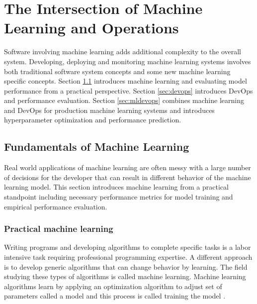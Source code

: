 \chapter{The Intersection of Machine Learning and Operations}
\label{chap:mloper}

Software involving machine learning adds additional complexity to the overall system. Developing, deploying and monitoring machine learning systems involves both traditional software system concepts and some new machine learning specific concepts. Section \ref{sec:ml} introduces machine learning and evaluating model performance from a practical perspective. Section \ref{sec:devops} introduces DevOps and performance evaluation. Section \ref{sec:mldevops} combines machine learning and DevOps for production machine learning systems and introduces hyperparameter optimization and performance prediction.

\section{Fundamentals of Machine Learning}
\label{sec:ml}
Real world applications of machine learning are often messy with a large number of decisions for the developer that can result in different behavior of the machine learning model. This section introduces machine learning from a practical standpoint including necessary performance metrics for model training and empirical performance evaluation.

\subsection{Practical machine learning}

Writing programs and developing algorithms to complete specific tasks is a labor intensive task requiring professional programming expertise.
A different approach is to develop generic algorithms that can change behavior by learning.
The field studying these types of algorithms is called machine learning.
Machine learning algorithms learn by applying an optimization algorithm to adjust set of parameters called a model and this process is called training the model \parencite{lecunDeepLearning2015}.


